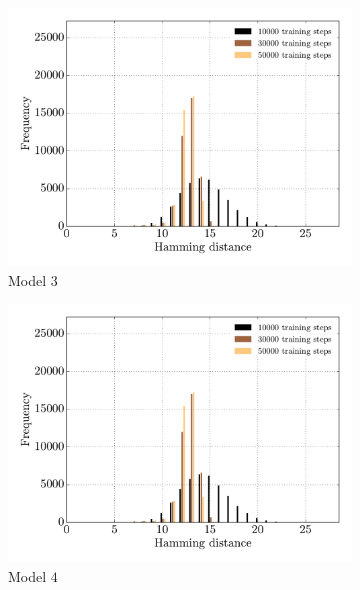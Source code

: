 \begin{figure}[p]
\begin{subfigure}{0.48\textwidth}
    	\centering
        \includegraphics[width=\textwidth]{appendix/hamming_freqs_model3}
        \caption{Model $3$}
        \label{fig:ham-freq-3}
    \end{subfigure}
    \hfill
    \begin{subfigure}{0.48\textwidth}
    	\centering
        \includegraphics[width=\textwidth]{appendix/hamming_freqs_model3}
        \caption{Model $4$}
        \label{fig:ham-freq-4}
    \end{subfigure}
    \begin{subfigure}{0.48\textwidth}
    	\centering

\end{subfigure}
\end{figure}
